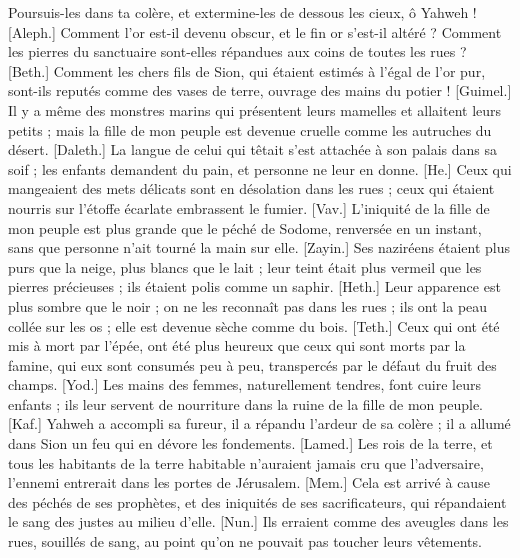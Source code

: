 \begin{multicols}{2}
Poursuis-les dans ta colère, et extermine-les de dessous les cieux, ô Yahweh !
\VerseOne{}[Aleph.] Comment l'or est-il devenu obscur, et le fin or s'est-il altéré ? Comment les pierres du sanctuaire sont-elles répandues aux coins de toutes les rues ?
[Beth.] Comment les chers fils de Sion, qui étaient estimés à l'égal de l'or pur, sont-ils reputés comme des vases de terre, ouvrage des mains du potier !
[Guimel.] Il y a même des monstres marins qui présentent leurs mamelles et allaitent leurs petits ; mais la fille de mon peuple est devenue cruelle comme les autruches du désert.
[Daleth.] La langue de celui qui têtait s'est attachée à son palais dans sa soif ; les enfants demandent du pain, et personne ne leur en donne.
[He.] Ceux qui mangeaient des mets délicats sont en désolation dans les rues ; ceux qui étaient nourris sur l'étoffe écarlate embrassent le fumier.
[Vav.] L'iniquité de la fille de mon peuple est plus grande que le péché de Sodome, renversée en un instant, sans que personne n'ait tourné la main sur elle.
[Zayin.] Ses naziréens étaient plus purs que la neige, plus blancs que le lait ; leur teint était plus vermeil que les pierres précieuses ; ils étaient polis comme un saphir.
[Heth.] Leur apparence est plus sombre que le noir ; on ne les reconnaît pas dans les rues ; ils ont la peau collée sur les os ; elle est devenue sèche comme du bois.
[Teth.] Ceux qui ont été mis à mort par l'épée, ont été plus heureux que ceux qui sont morts par la famine, qui eux sont consumés peu à peu, transpercés par le défaut du fruit des champs.
[Yod.] Les mains des femmes, naturellement tendres, font cuire leurs enfants ; ils leur servent de nourriture dans la ruine de la fille de mon peuple.
[Kaf.] Yahweh a accompli sa fureur, il a répandu l'ardeur de sa colère ; il a allumé dans Sion un feu qui en dévore les fondements.
[Lamed.] Les rois de la terre, et tous les habitants de la terre habitable n'auraient jamais cru que l'adversaire, l'ennemi entrerait dans les portes de Jérusalem.
[Mem.] Cela est arrivé à cause des péchés de ses prophètes, et des iniquités de ses sacrificateurs, qui répandaient le sang des justes au milieu d'elle.
[Nun.] Ils erraient comme des aveugles dans les rues, souillés de sang, au point qu'on ne pouvait pas toucher leurs vêtements.

\end{multicols}
